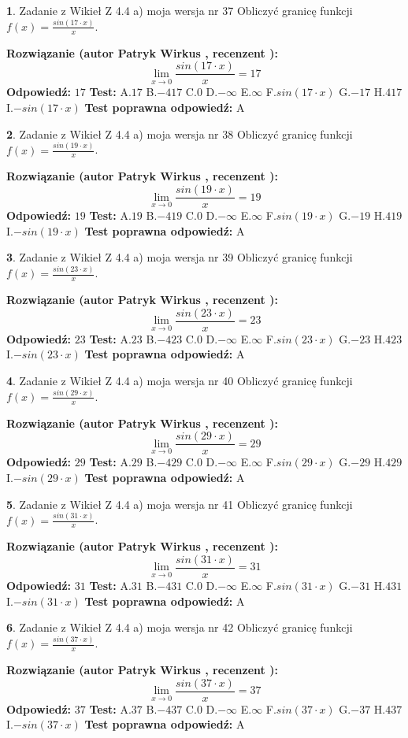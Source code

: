 \documentclass[12pt, a4paper]{article}
\theoremstyle{definition} %
\newtheorem{zad}{}
\newcommand{\zadStart}[1]{\begin{zad}#1\newline}
\newcommand{\zadStop}{\end{zad}}
\newcommand{\rozwStart}[2]{\noindent \textbf{Rozwiązanie (autor #1 , recenzent #2): }\newline}
\newcommand{\rozwStop}{\newline}
\newcommand{\odpStart}{\noindent \textbf{Odpowiedź:}\newline}
\newcommand{\odpStop}{\newline}
\newcommand{\testStart}{\noindent \textbf{Test:}\newline}
\newcommand{\testStop}{\newline}
\newcommand{\kluczStart}{\noindent \textbf{Test poprawna odpowiedź:}\newline}
\newcommand{\kluczStop}{\newline}
\begin{document}
\zadStart{Zadanie z Wikieł Z 4.4 a) moja wersja nr 37}
Obliczyć granicę funkcji $f(x)=\frac{sin(17\cdot x)}{x}$.
\zadStop
\rozwStart{Patryk Wirkus}{}
$$\lim\limits_{x\to 0}\frac{sin(17\cdot x)}{x}=
17$$
\rozwStop
\odpStart
$17$
\odpStop
\testStart
A.$17$
B.$-417$
C.$0$
D.$-\infty$
E.$\infty$
F.$sin(17\cdot x)$
G.$-17$
H.$417$
I.$-sin(17\cdot x)$
\testStop
\kluczStart
A
\kluczStop



\zadStart{Zadanie z Wikieł Z 4.4 a) moja wersja nr 38}
Obliczyć granicę funkcji $f(x)=\frac{sin(19\cdot x)}{x}$.
\zadStop
\rozwStart{Patryk Wirkus}{}
$$\lim\limits_{x\to 0}\frac{sin(19\cdot x)}{x}=
19$$
\rozwStop
\odpStart
$19$
\odpStop
\testStart
A.$19$
B.$-419$
C.$0$
D.$-\infty$
E.$\infty$
F.$sin(19\cdot x)$
G.$-19$
H.$419$
I.$-sin(19\cdot x)$
\testStop
\kluczStart
A
\kluczStop



\zadStart{Zadanie z Wikieł Z 4.4 a) moja wersja nr 39}
Obliczyć granicę funkcji $f(x)=\frac{sin(23\cdot x)}{x}$.
\zadStop
\rozwStart{Patryk Wirkus}{}
$$\lim\limits_{x\to 0}\frac{sin(23\cdot x)}{x}=
23$$
\rozwStop
\odpStart
$23$
\odpStop
\testStart
A.$23$
B.$-423$
C.$0$
D.$-\infty$
E.$\infty$
F.$sin(23\cdot x)$
G.$-23$
H.$423$
I.$-sin(23\cdot x)$
\testStop
\kluczStart
A
\kluczStop



\zadStart{Zadanie z Wikieł Z 4.4 a) moja wersja nr 40}
Obliczyć granicę funkcji $f(x)=\frac{sin(29\cdot x)}{x}$.
\zadStop
\rozwStart{Patryk Wirkus}{}
$$\lim\limits_{x\to 0}\frac{sin(29\cdot x)}{x}=
29$$
\rozwStop
\odpStart
$29$
\odpStop
\testStart
A.$29$
B.$-429$
C.$0$
D.$-\infty$
E.$\infty$
F.$sin(29\cdot x)$
G.$-29$
H.$429$
I.$-sin(29\cdot x)$
\testStop
\kluczStart
A
\kluczStop



\zadStart{Zadanie z Wikieł Z 4.4 a) moja wersja nr 41}
Obliczyć granicę funkcji $f(x)=\frac{sin(31\cdot x)}{x}$.
\zadStop
\rozwStart{Patryk Wirkus}{}
$$\lim\limits_{x\to 0}\frac{sin(31\cdot x)}{x}=
31$$
\rozwStop
\odpStart
$31$
\odpStop
\testStart
A.$31$
B.$-431$
C.$0$
D.$-\infty$
E.$\infty$
F.$sin(31\cdot x)$
G.$-31$
H.$431$
I.$-sin(31\cdot x)$
\testStop
\kluczStart
A
\kluczStop



\zadStart{Zadanie z Wikieł Z 4.4 a) moja wersja nr 42}
Obliczyć granicę funkcji $f(x)=\frac{sin(37\cdot x)}{x}$.
\zadStop
\rozwStart{Patryk Wirkus}{}
$$\lim\limits_{x\to 0}\frac{sin(37\cdot x)}{x}=
37$$
\rozwStop
\odpStart
$37$
\odpStop
\testStart
A.$37$
B.$-437$
C.$0$
D.$-\infty$
E.$\infty$
F.$sin(37\cdot x)$
G.$-37$
H.$437$
I.$-sin(37\cdot x)$
\testStop
\kluczStart
A
\kluczStop
\end{document}
